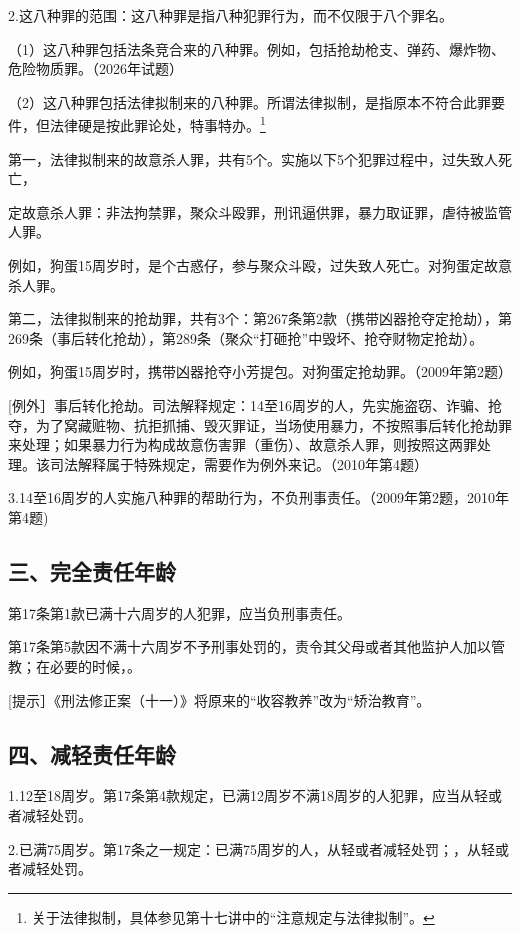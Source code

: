 2.这八种罪的范围：这八种罪是指八种犯罪行为，而不仅限于八个罪名。

（1）这八种罪包括法条竞合来的八种罪。例如，包括抢劫枪支、弹药、爆炸物、危险物质罪。（2026年试题）

（2）这八种罪包括法律拟制来的八种罪。所谓法律拟制，是指原本不符合此罪要件，但法律硬是按此罪论处，特事特办。\footnote{关于法律拟制，具体参见第十七讲中的“注意规定与法律拟制”。}

第一，法律拟制来的故意杀人罪，共有5个。实施以下5个犯罪过程中，过失致人死亡，

定故意杀人罪：非法拘禁罪，聚众斗殴罪，刑讯逼供罪，暴力取证罪，虐待被监管人罪。

例如，狗蛋15周岁时，是个古惑仔，参与聚众斗殴，过失致人死亡。对狗蛋定故意杀人罪。

第二，法律拟制来的抢劫罪，共有3个：第267条第2款（携带凶器抢夺定抢劫），第269条（事后转化抢劫），第289条（聚众“打砸抢”中毁坏、抢夺财物定抢劫）。

例如，狗蛋15周岁时，携带凶器抢夺小芳提包。对狗蛋定抢劫罪。（2009年第2题）

[例外］事后转化抢劫。司法解释规定：14至16周岁的人，先实施盗窃、诈骗、抢夺，为了窝藏赃物、抗拒抓捕、毁灭罪证，当场使用暴力，不按照事后转化抢劫罪来处理；如果暴力行为构成故意伤害罪（重伤）、故意杀人罪，则按照这两罪处理。该司法解释属于特殊规定，需要作为例外来记。（2010年第4题）

3.14至16周岁的人实施八种罪的帮助行为，不负刑事责任。（2009年第2题，2010年第4题)

\subsection*{三、完全责任年龄}

第17条第1款已满十六周岁的人犯罪，应当负刑事责任。

第17条第5款因不满十六周岁不予刑事处罚的，责令其父母或者其他监护人加以管教；在必要的时候，。

[提示］《刑法修正案（十一）》将原来的“收容教养”改为“矫治教育”。

\subsection*{四、减轻责任年龄}

1.12至18周岁。第17条第4款规定，已满12周岁不满18周岁的人犯罪，应当从轻或者减轻处罚。

2.已满75周岁。第17条之一规定：已满75周岁的人，从轻或者减轻处罚；，从轻或者减轻处罚。

